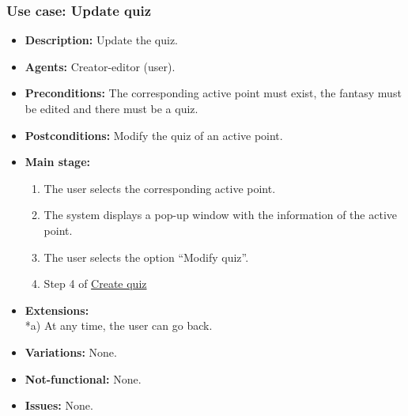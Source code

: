 \subsubsection{Use case: Update quiz}
\begin{itemize}
	\item \textbf{Description:} Update the quiz.
	\item \textbf{Agents:} Creator-editor (user).
	\item \textbf{Preconditions:} The corresponding active point must exist, the fantasy must be edited and there must be a quiz.
	\item \textbf{Postconditions:} Modify the quiz of an active point.
	\item \textbf{Main stage:}
	\begin{enumerate}
		\item The user selects the corresponding active point.
		\item The system displays a pop-up window with the information of the active point.
		\item The user selects the option ``Modify quiz''.
		\item Step 4 of \hyperlink{crearquiz} {Create quiz}
	\end{enumerate}
	\item \textbf{Extensions:} \\ *a) At any time, the user can go back.
	\item \textbf{Variations:} None.
	\item \textbf{Not-functional:} None.
	\item \textbf{Issues:} None.
\end{itemize}

